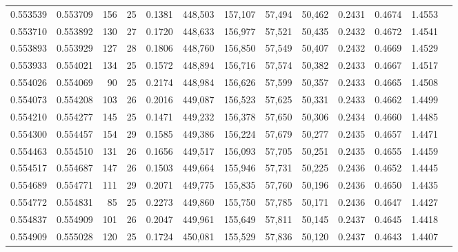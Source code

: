 \begin{tabular}{rrrrrrrrrrrrr}
0.553539 & 0.553709 & 156 &  25 &                                     0.1381 & 448,503 & 157,107 &  57,494 &  50,462 & 0.2431 & 0.4674 & 1.4553 \\
0.553710 & 0.553892 & 130 &  27 &                                     0.1720 & 448,633 & 156,977 &  57,521 &  50,435 & 0.2432 & 0.4672 & 1.4541 \\
0.553893 & 0.553929 & 127 &  28 &                                     0.1806 & 448,760 & 156,850 &  57,549 &  50,407 & 0.2432 & 0.4669 & 1.4529 \\
0.553933 & 0.554021 & 134 &  25 &                                     0.1572 & 448,894 & 156,716 &  57,574 &  50,382 & 0.2433 & 0.4667 & 1.4517 \\
0.554026 & 0.554069 &  90 &  25 &                                     0.2174 & 448,984 & 156,626 &  57,599 &  50,357 & 0.2433 & 0.4665 & 1.4508 \\
0.554073 & 0.554208 & 103 &  26 &                                     0.2016 & 449,087 & 156,523 &  57,625 &  50,331 & 0.2433 & 0.4662 & 1.4499 \\
0.554210 & 0.554277 & 145 &  25 &                                     0.1471 & 449,232 & 156,378 &  57,650 &  50,306 & 0.2434 & 0.4660 & 1.4485 \\
0.554300 & 0.554457 & 154 &  29 &                                     0.1585 & 449,386 & 156,224 &  57,679 &  50,277 & 0.2435 & 0.4657 & 1.4471 \\
0.554463 & 0.554510 & 131 &  26 &                                     0.1656 & 449,517 & 156,093 &  57,705 &  50,251 & 0.2435 & 0.4655 & 1.4459 \\
0.554517 & 0.554687 & 147 &  26 &                                     0.1503 & 449,664 & 155,946 &  57,731 &  50,225 & 0.2436 & 0.4652 & 1.4445 \\
0.554689 & 0.554771 & 111 &  29 &                                     0.2071 & 449,775 & 155,835 &  57,760 &  50,196 & 0.2436 & 0.4650 & 1.4435 \\
0.554772 & 0.554831 &  85 &  25 &                                     0.2273 & 449,860 & 155,750 &  57,785 &  50,171 & 0.2436 & 0.4647 & 1.4427 \\
0.554837 & 0.554909 & 101 &  26 &                                     0.2047 & 449,961 & 155,649 &  57,811 &  50,145 & 0.2437 & 0.4645 & 1.4418 \\
0.554909 & 0.555028 & 120 &  25 &                                     0.1724 & 450,081 & 155,529 &  57,836 &  50,120 & 0.2437 & 0.4643 & 1.4407 \\

\end{tabular}
